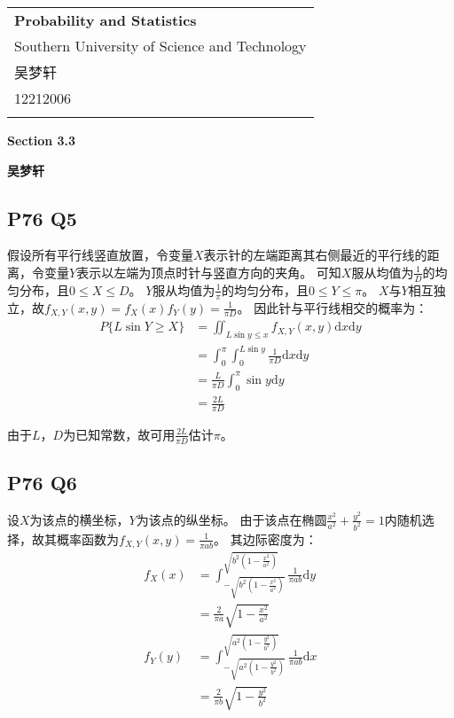 \documentclass[a4paper,12pt]{ctexart}
\begin{document}
\thispagestyle{empty} %

\begin{tabular}{p{15.5cm}}
{\large \bf Probability and Statistics} \\
Southern University of Science and Technology \\ 吴梦轩 \\ 12212006 \\
\hline
\\
\end{tabular}

\vspace*{0.3cm} %

\begin{center}
	{\Large \bf Section 3.3}
	\vspace{2mm}

	{\bf 吴梦轩}
		
\end{center}  

\vspace{0.4cm}

\subsection*{P76 Q5}

假设所有平行线竖直放置，令变量$X$表示针的左端距离其右侧最近的平行线的距离，令变量$Y$表示以左端为顶点时针与竖直方向的夹角。
可知$X$服从均值为$\frac{1}{D}$的均匀分布，且$0 \leq X \leq D$。
$Y$服从均值为$\frac{1}{\pi}$的均匀分布，且$0 \leq Y \leq \pi$。
$X$与$Y$相互独立，故$f_{X,Y}(x,y) = f_X(x) f_Y(y) = \frac{1}{\pi D}$。
因此针与平行线相交的概率为：
\begin{align*}
	P\{L \sin Y \geq X\} &= \iint_{L \sin y \leq x} f_{X,Y}(x,y) \mathrm{d}x \mathrm{d}y \\
	&= \int_0^{\pi} \int_0^{L \sin y} \frac{1}{\pi D} \mathrm{d}x \mathrm{d}y \\
	&= \frac{L}{\pi D} \int_0^{\pi} \sin y \mathrm{d}y \\
	&= \frac{2L}{\pi D}
\end{align*}

由于$L$，$D$为已知常数，故可用$\frac{2L}{\pi D}$估计$\pi$。

\subsection*{P76 Q6}

设$X$为该点的横坐标，$Y$为该点的纵坐标。
由于该点在椭圆$\frac{x^2}{a^2} + \frac{y^2}{b^2} = 1$内随机选择，故其概率函数为$f_{X,Y}(x,y) = \frac{1}{\pi a b}$。
其边际密度为：
\begin{align*}
	f_X(x) &= \int_{-\sqrt{b^2 (1 - \frac{x^2}{a^2})}}^{\sqrt{b^2 (1 - \frac{x^2}{a^2})}} \frac{1}{\pi a b} \mathrm{d}y \\
	&= \frac{2}{\pi a} \sqrt{1 - \frac{x^2}{a^2}} \\
	f_Y(y) &= \int_{-\sqrt{a^2 (1 - \frac{y^2}{b^2})}}^{\sqrt{a^2 (1 - \frac{y^2}{b^2})}} \frac{1}{\pi a b} \mathrm{d}x \\
	&= \frac{2}{\pi b} \sqrt{1 - \frac{y^2}{b^2}}
\end{align*}
\end{document}

